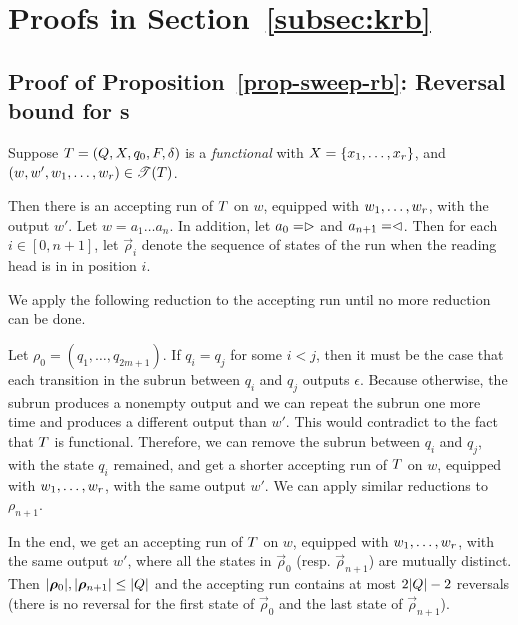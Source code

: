 \newcommand\init{\mathsf{init}}
\newcommand\prefix{\mathsf{prefix}}
\newcommand\suffix{\mathsf{suffix}}
\newcommand\finalpass{\mathsf{finalpass}}
\newcommand\reverse{\mathsf{reverse}}
\newcommand\concatpt{\mathsf{concat}}
\newcommand\symof[1]{\overline{#1}}

\section{Proofs in Section~\ref{subsec:krb} }\label{app-rb-2pt}

\subsection{Proof of Proposition~\ref{prop-sweep-rb}: Reversal bound for \SPPT{}s}

Suppose $T=(Q, X, q_0, F, \delta)$ is a \emph{functional} \SPPT{}  with $X= \{x_1,\ldots, x_r\}$, and $(w, w', w_1,\ldots, w_r) \in \mathscr{T}(T)$. 

Then there is an accepting run of $T$ on $w$, equipped with $w_1,\ldots, w_r$, with the output $w'$. 
Let $w = a_1 \ldots a_n$. In addition, let $a_0 = \vartriangleright$ and $a_{n+1} = \vartriangleleft$. 
Then for each $i \in [0, n+1]$, let $\vec{\rho}_i$ denote the sequence of states of the run when the reading head is in in position $i$.

We apply the following reduction to the accepting run until no more reduction can be done. 

Let $\rho_0 = (q_1, \ldots, q_{2m+1})$. If $q_i = q_j$ for some $i < j$, then it must be the case that each transition in the subrun between $q_i$ and $q_j$ outputs $\epsilon$. Because otherwise, the subrun produces a nonempty output and we can repeat the subrun one more time and produces a different output than $w'$. This would contradict to the fact that $T$ is functional. Therefore, we can remove the subrun between $q_i$ and $q_j$, with the state $q_i$ remained, and get a shorter accepting run of $T$ on $w$, equipped with $w_1,\ldots, w_r$, with the same output $w'$.
We can apply similar reductions to $\rho_{n+1}$.

In the end, we get an accepting run of $T$ on $w$, equipped with $w_1,\ldots, w_r$, with the same output $w'$, where all the states in $\vec{\rho}_0$ (resp. $\vec{\rho}_{n+1}$) are mutually distinct. Then $|\vec{\rho}_0|, |\vec{\rho}_{n+1}| \le |\controls|$ and the accepting run contains at most $2|Q|-2$ reversals (there is no reversal for the first state of $\vec{\rho}_0$ and the last state of $\vec{\rho}_{n+1}$). 


